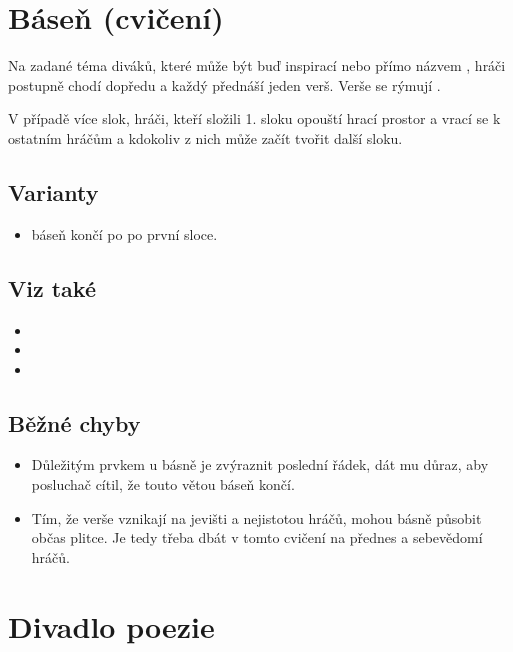  
 
 
 
\needspace{5cm} \section{Báseň (cvičení)} \label{báseň (cvičení)} Na zadané téma diváků, které může být buď inspirací nebo přímo názvem , hráči postupně chodí dopředu a každý přednáší  
jeden verš. Verše se rýmují . 
 
V případě více slok, hráči, kteří složili 1. sloku opouští hrací prostor a vrací se k ostatním hráčům a kdokoliv z nich může začít tvořit 
další sloku. 
 
\subsection{Varianty} \begin{itemize}
\item  báseň končí po po první sloce.
\end{itemize}
  
\subsection{Viz také} \begin{itemize}
\item {}
\item {}
\item {}
\end{itemize}
 
\subsection{Běžné chyby} \begin{itemize}
\item Důležitým prvkem u básně je zvýraznit poslední řádek, dát mu důraz, aby posluchač cítil, že touto větou báseň končí.
\item Tím, že verše vznikají na jevišti a nejistotou hráčů, mohou básně působit občas plitce. Je tedy třeba dbát v tomto cvičení na přednes a sebevědomí hráčů.
\end{itemize}
 
 
 
 
\needspace{5cm} \section{Divadlo poezie} \label{divadlo poezie}  
 
